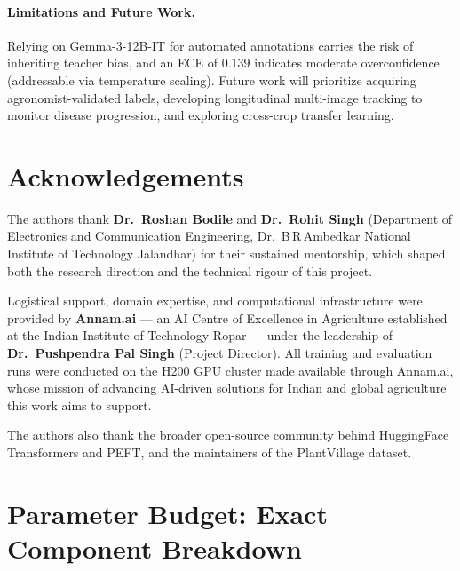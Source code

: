 \documentclass{article}
\begin{document}
\paragraph{Limitations and Future Work.}
Relying on Gemma-3-12B-IT for automated annotations carries the risk of inheriting teacher bias, and an ECE of $0.139$ indicates moderate overconfidence (addressable via temperature scaling). Future work will prioritize acquiring agronomist-validated labels, developing longitudinal multi-image tracking to monitor disease progression, and exploring cross-crop transfer learning.
\section*{Acknowledgements}

The authors thank \textbf{Dr.\ Roshan Bodile} and \textbf{Dr.\ Rohit Singh}
(Department of Electronics and Communication Engineering,
Dr.\ B\,R\,Ambedkar National Institute of Technology Jalandhar)
for their sustained mentorship, which shaped both the research direction
and the technical rigour of this project.

Logistical support, domain expertise, and computational infrastructure
were provided by \textbf{Annam.ai} — an AI Centre of Excellence in
Agriculture established at the Indian Institute of Technology Ropar —
under the leadership of \textbf{Dr.\ Pushpendra Pal Singh} (Project
Director). All training and evaluation runs were conducted on the H200
GPU cluster made available through Annam.ai, whose mission of advancing
AI-driven solutions for Indian and global agriculture this work aims to
support.

The authors also thank the broader open-source community behind
HuggingFace Transformers and PEFT, and the maintainers of the
PlantVillage dataset.




\clearpage
\appendix

\section{Parameter Budget: Exact Component Breakdown}
\label{app:params}
\end{document}
